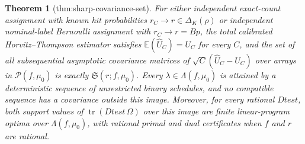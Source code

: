 \documentclass{article}
\newtheorem{theorem}{Theorem}
\begin{document}
\begin{theorem}[thm:sharp-covariance-set]\label{thm:sharp-covariance-set}
For either independent exact-count assignment with known hit probabilities \(r_C\to r\in\Delta_K(\rho)\) or independent nominal-label Bernoulli assignment with \(r_C\to r=Bp\), the total calibrated Horvitz--Thompson estimator satisfies \(\mathbb E(\widehat U_C)=U_C\) for every \(C\), and the set of all subsequential asymptotic covariance matrices of \(\sqrt C(\widehat U_C-U_C)\) over arrays in \(\mathcal P(f,\mu_0)\) is exactly \(\mathfrak S(r;f,\mu_0)\). Every \(\lambda\in\Lambda(f,\mu_0)\) is attained by a deterministic sequence of unrestricted binary schedules, and no compatible sequence has a covariance outside this image. Moreover, for every rational \(Dtest\), both support values of \(\operatorname{tr}(Dtest\,\Omega)\) over this image are finite linear-program optima over \(\Lambda(f,\mu_0)\), with rational primal and dual certificates when \(f\) and \(r\) are rational.
\end{theorem}
\end{document}
